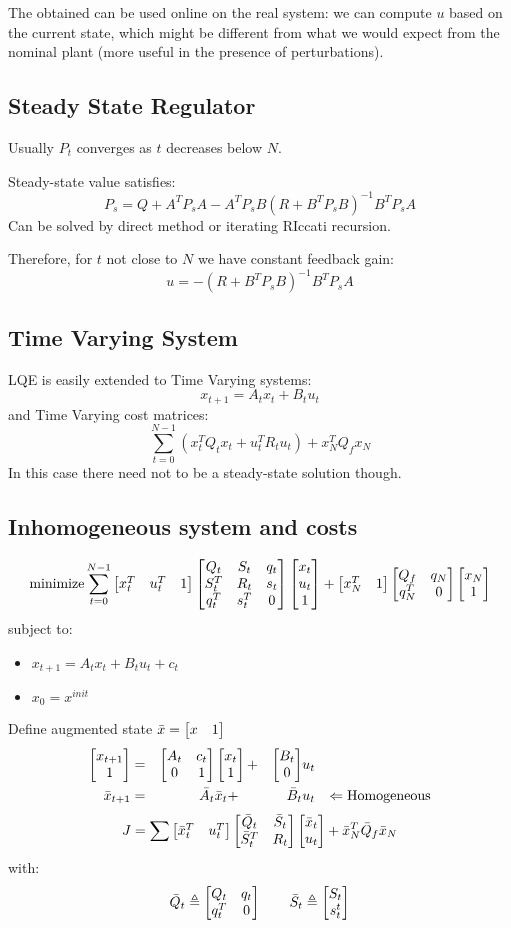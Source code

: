 The obtained  can be used online on the real system: we can compute $u$ based on the current state, which might be different from what we would expect from the nominal plant (more useful in the presence of perturbations).

\subsection{Steady State Regulator}
Usually $P_t$ converges as $t$ decreases below $N$.

Steady-state value satisfies:
\[P_s = Q+A^TP_sA - A^TP_sB(R+B^TP_sB)^{-1}B^TP_sA\]
Can be solved by direct method or iterating RIccati recursion.

Therefore, for $t$ not close to $N$ we have constant feedback gain:
\[u = -(R+B^TP_sB)^{-1}B^TP_sA\]
\subsection{Time Varying System}
LQE is easily extended to Time Varying systems:
\[x_{t+1} =A_tx_t + B_tu_t\]
and Time Varying cost matrices:
\[\sum_{t=0}^{N-1}(x_t^TQ_tx_t + u_t^TR_tu_t) + x_N^TQ_fx_N\]
In this case there need not to be a steady-state solution though.
\subsection{Inhomogeneous system and costs}
\[\operatorname*{minimize} \sum_{t=0}^{N-1}\begin{bmatrix}x_t^T&u_t^T&1\end{bmatrix}\begin{bmatrix}Q_t&S_t&q_t\\S_t^T&R_t&s_t\\q_t^T&s_t^T&0\end{bmatrix}\begin{bmatrix}x_t\\u_t\\1\end{bmatrix} + \begin{bmatrix}x_N^T&1\end{bmatrix}\begin{bmatrix}Q_f&q_N\\q_N^T&0\end{bmatrix}\begin{bmatrix}x_N\\1\end{bmatrix}\]
subject to:
\begin{itemize}
\item $x_{t+1} = A_tx_t + B_tu_t + c_t$
\item $x_0 = x^{init}$
\end{itemize}
Define augmented state $\bar{x} = \begin{bmatrix}x&1\end{bmatrix}$
\begin{align*}
\begin{bmatrix}x_{t+1}\\1\end{bmatrix} &=&\begin{bmatrix}A_t&c_t\\0&1\end{bmatrix}&\begin{bmatrix}x_t\\1\end{bmatrix} + &\begin{bmatrix}B_t\\0\end{bmatrix}&u_t&\\
\bar{x}_{t+1} &= &\bar{A}_t &\bar{x}_t  + &\bar{B}_t &u_t&\Leftarrow \text{Homogeneous}
\end{align*}
\[J = \sum \begin{bmatrix}\bar{x}_t^T&u_t^T\end{bmatrix}\begin{bmatrix}\bar{Q}_t&\bar{S}_t\\\bar{S}_t^T&R_t\end{bmatrix}\begin{bmatrix}\bar{x}_t\\u_t\end{bmatrix} + \bar{x}_N^T\bar{Q}_f\bar{x}_N\]
with:
\begin{gather*}
\bar{Q}_t\triangleq \begin{bmatrix}Q_t&q_t\\q_t^T&0\end{bmatrix}\qquad\bar{S}_t\triangleq\begin{bmatrix}S_t\\s_t^t\end{bmatrix}
\end{gather*}

